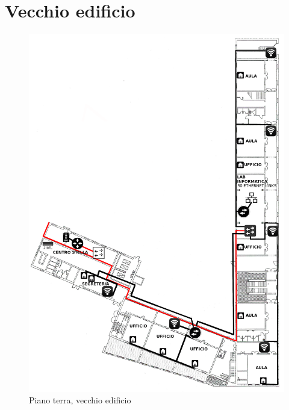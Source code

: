 \documentclass[11pt, a4paper, oneside]{article}
\begin{document}
		\section{Vecchio edificio}
			\begin{figure}[H]
				\caption{Piano terra, vecchio edificio}
				\includegraphics[scale=0.2]{architecture-001.png}
			\end{figure}
\end{document}
